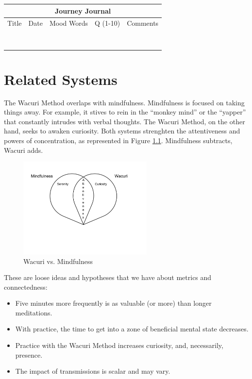 \documentclass[12pt]{book}
\begin{document}
\begin{tabular}{ |p{2cm}||p{2cm}|p{3cm}|p{1cm}|p{5cm}|  }
 \hline
 \multicolumn{5}{|c|}{Journey Journal} \\
 \hline
 Title& Date & Mood Words & Q (1-10) & Comments\\
  \hline
 \hline
 & & & & \\
 \hline 
 & & & & \\
 \hline 
 & & & & \\
 \hline 
 & & & & \\
 \hline 
 & & & & \\
 \hline 
 & & & & \\
 \hline 
 & & & & \\
 \hline 
  & & & & \\
 \hline
  \hline
\end{tabular}



\chapter{Related Systems}

The Wacuri Method overlaps with mindfulness.  Mindfulness is focused
on taking things away. For example, it stives to rein in the
``monkey mind'' or the ``yapper'' that constantly intrudes with
verbal thoughts. The Wacuri Method, on the other hand, seeks
to awaken curiosity. Both systems strenghten the attentiveness
and powers of concentration, as represented in Figure \ref{fig:wacurivsmindfulness}. Mindfulness subtracts, Wacuri adds.

\begin{figure}
  \centering
     \includegraphics[width=0.6\textwidth]{WacuriFigures/WacuriMindfulnessDiagram.png}
     \caption{Wacuri vs. Mindfulness}
  \label{fig:wacurivsmindfulness}     
\end{figure}

These are loose ideas and hypotheses that we have about metrics and connectedness:
\begin{itemize}
\item Five minutes more frequently is as valuable (or more) than longer meditations.
\item With practice, the time to get into a zone of beneficial mental state decreases.
\item Practice with the Wacuri Method increases curiosity, and, necessarily, presence.
  \item The impact of transmissions is scalar and may vary.
  \end{itemize}
\end{document}
